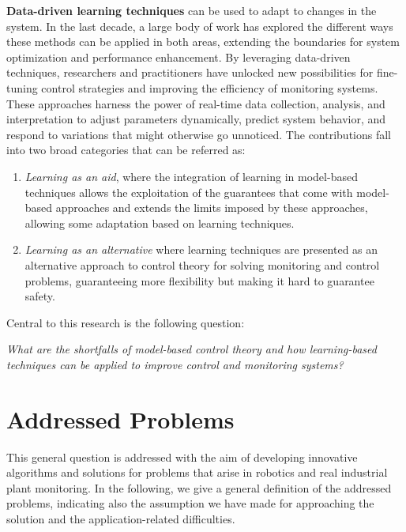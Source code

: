 \textbf{Data-driven learning techniques} can be used to adapt to changes in the system.
In the last decade, a large body of work has explored the different ways these methods can be applied in both areas, extending the boundaries for system optimization and performance enhancement. By leveraging data-driven techniques, researchers and practitioners have unlocked new possibilities for fine-tuning control strategies and improving the efficiency of monitoring systems. These approaches harness the power of real-time data collection, analysis, and interpretation to adjust parameters dynamically, predict system behavior, and respond to variations that might otherwise go unnoticed.
The contributions fall into two broad categories that can be referred as:
\begin{enumerate}
    \item \textit{Learning as  an aid}, where the integration of learning in model-based techniques allows the exploitation of the guarantees that come with model-based approaches and extends the limits imposed by these approaches, allowing some adaptation based on learning techniques.
    \item \textit{Learning as an alternative} where learning techniques are presented as an alternative approach to control theory for solving monitoring and control problems, guaranteeing more flexibility but making it hard to guarantee safety.
\end{enumerate}    
Central to this research is the following question:\begin{center}
\textit{ What are the shortfalls of model-based control theory and how learning-based techniques can be applied to improve control and monitoring systems?}  
\end{center}

\section{Addressed Problems}
This general question is addressed with the aim of developing innovative algorithms and solutions for problems that arise in robotics and real industrial plant monitoring. In the following, we give a general definition of the  addressed problems, indicating also the assumption we have made for approaching the solution and the application-related difficulties.   
